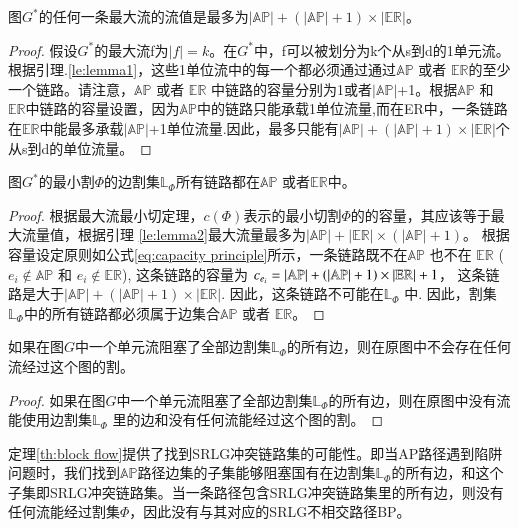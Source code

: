 \begin{lemma}
\label{le:lemma2}
    图$G^*$的任何一条最大流的流值是最多为$|\mathbb{AP}|+(|\mathbb{AP}|+1)\times|\mathbb{\mathbb{ER}}|$。
\end{lemma}
\begin{proof}
假设$G^*$的最大流f为$|f|=k$。在$G^*$中，f可以被划分为k个从s到d的1单元流。根据引理.\ref{le:lemma1}，这些1单位流中的每一个都必须通过通过$\mathbb{AP}$ 或者 $\mathbb{\mathbb{ER}}$的至少一个链路。请注意，$\mathbb{AP}$ 或者 $\mathbb{\mathbb{ER}}$ 中链路的容量分别为1或者$|\mathbb{AP}|$+1。根据$\mathbb{AP}$ 和 $\mathbb{\mathbb{ER}}$中链路的容量设置，因为$\mathbb{AP}$中的链路只能承载1单位流量,而在ER中，一条链路在$\mathbb{ER}$中能最多承载$|\mathbb{AP}|$+1单位流量.因此，最多只能有$|\mathbb{AP}|+ (|\mathbb{AP}|+1)\times|\mathbb{\mathbb{ER}}|$个从s到d的单位流量。
\end{proof}

\begin{lemma}
\label{le:lemma3}
    图$G^*$的最小割$\Phi$的边割集$\mathbb{L}_{\Phi}$所有链路都在$\mathbb{AP}$ 或者$\mathbb{\mathbb{ER}}$中。
\end{lemma}

\begin{proof}
根据最大流最小切定理，$c(\Phi)$表示的最小切割$\Phi$的的容量，其应该等于最大流量值，根据引理 \ref{le:lemma2}最大流量最多为$|\mathbb{AP}|+ |\mathbb{ER}|\times (|\mathbb{AP}|+1)$。 根据容量设定原则如公式\ref{eq:capacity principle}所示，一条链路既不在$\mathbb{AP}$ 也不在 $\mathbb{ER}$ ($e_i \notin \mathbb{AP}$ 和 $e_i \notin \mathbb{ER}$), 这条链路的容量为 $c_{e_i} = \left| {{\rm\mathbb{AP}}} \right| + \left( {\left| {{\rm\mathbb{AP}}} \right| + 1} \right)\times \left| {{\rm{\mathbb{E}}}{{\rm{\mathbb{R}}}}} \right| + 1$， 这条链路是大于$|\mathbb{AP}|+(|\mathbb{AP}|+1)\times |\mathbb{ER}|$. 因此，这条链路不可能在$\mathbb{L}_{\Phi}$ 中. 因此，割集$\mathbb{L}_{\Phi}$中的所有链路都必须属于边集合$\mathbb{AP}$ 或者 $\mathbb{ER}$。
\end{proof}


\begin{theorem}
    如果在图$G$中一个单元流阻塞了全部边割集$\mathbb{L}_{\Phi}$的所有边，则在原图中不会存在任何流经过这个图的割。
\label{th:block flow}
\end{theorem}


\begin{proof}
    如果在图$G$中一个单元流阻塞了全部边割集$\mathbb{L}_{\Phi}$的所有边，则在原图中没有流能使用边割集$\mathbb{L}_{\Phi}$ 里的边和没有任何流能经过这个图的割。
\end{proof}
定理\ref{th:block flow}提供了找到SRLG冲突链路集的可能性。即当AP路径遇到陷阱问题时，我们找到$\mathbb{AP}$路径边集的子集能够阻塞国有在边割集$\mathbb{L}_{\Phi}$的所有边，和这个子集即SRLG冲突链路集。当一条路径包含SRLG冲突链路集里的所有边，则没有任何流能经过割集$\Phi$，因此没有与其对应的SRLG不相交路径BP。

